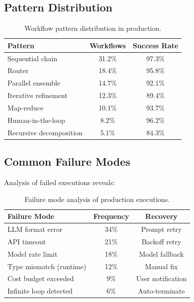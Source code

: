 \subsection{Pattern Distribution}

\begin{table}[H]
\centering
\small
\begin{tabular}{lcc}
\toprule
\textbf{Pattern} & \textbf{Workflows} & \textbf{Success Rate} \\
\midrule
Sequential chain & 31.2\% & 97.3\% \\
Router & 18.4\% & 95.8\% \\
Parallel ensemble & 14.7\% & 92.1\% \\
Iterative refinement & 12.3\% & 89.4\% \\
Map-reduce & 10.1\% & 93.7\% \\
Human-in-the-loop & 8.2\% & 96.2\% \\
Recursive decomposition & 5.1\% & 84.3\% \\
\bottomrule
\end{tabular}
\caption{Workflow pattern distribution in production.}
\label{tab:patterns}
\end{table}

\subsection{Common Failure Modes}

Analysis of failed executions reveals:

\begin{table}[H]
\centering
\small
\begin{tabular}{lcc}
\toprule
\textbf{Failure Mode} & \textbf{Frequency} & \textbf{Recovery} \\
\midrule
LLM format error & 34\% & Prompt retry \\
API timeout & 21\% & Backoff retry \\
Model rate limit & 18\% & Model fallback \\
Type mismatch (runtime) & 12\% & Manual fix \\
Cost budget exceeded & 9\% & User notification \\
Infinite loop detected & 6\% & Auto-terminate \\
\bottomrule
\end{tabular}
\caption{Failure mode analysis of production executions.}
\label{tab:failures}
\end{table}

